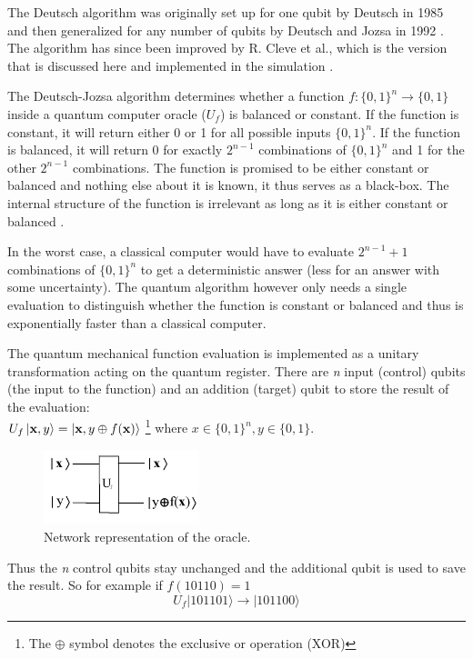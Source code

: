 The Deutsch algorithm was originally set up for one qubit by Deutsch in 1985 and then generalized for any number of qubits by Deutsch and Jozsa in 1992 \cite{deutsch1985}. The algorithm has since been improved by R. Cleve et al., which is the version that is discussed here and implemented in the simulation \cite{cleve1998}.

The Deutsch-Jozsa algorithm determines whether a function \( f : \{0,1\}^n \to \{0,1\} \) inside a quantum computer oracle (\(U_f\)) is balanced or constant. If the function is constant, it will return either 0 or 1 for all possible inputs \( \{0,1\}^n\). If the function is balanced, it will return 0 for exactly \( 2^{n-1} \) combinations of \( \{0,1\}^n\) and 1 for the other \(  2^{n-1} \) combinations. The function is promised to be either constant or balanced and nothing else about it is known, it thus serves as a black-box. The internal structure of the function is irrelevant as long as it is either constant or balanced \cite{cleve1998,stolze2008}.

In the worst case, a classical computer would have to evaluate \(2^{n-1}+1\) combinations of \( \{0,1\}^n \) to get a deterministic answer (less for an answer with some uncertainty). The quantum algorithm however only needs a single evaluation to distinguish whether the function is constant or balanced and thus is exponentially faster than a classical computer.

The quantum mechanical function evaluation is implemented as a unitary transformation acting on the quantum register. There are \emph{n} input (control) qubits (the input to the function) and an addition (target) qubit to store the result of the evaluation: \\ \( U_f\left|  \mathbf{x} , y \right> = \left|  \mathbf{x} ,y \oplus f( \mathbf{x} )  \right>\) \footnote{The \(\oplus\) symbol denotes the exclusive or operation (XOR)} where \( x \in \{0,1\}^n , y  \in \{0,1\} \).

\begin{figure}[H]
	\centering
	\includegraphics[width=45mm]{./images/deutsch1}
	\caption{Network representation of the oracle.}
\end{figure}

Thus the \emph{n} control qubits stay unchanged and the additional qubit is used to save the result. So for example if \( f(10110) = 1 \) \begin{displaymath} U_f|101101\rangle \to |101100\rangle  \end{displaymath}

